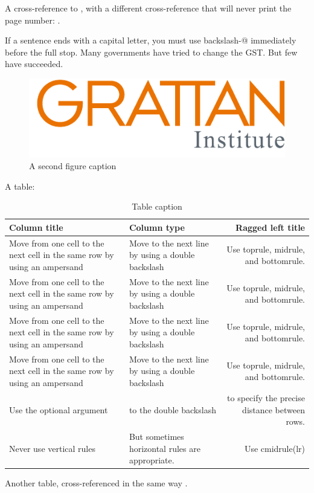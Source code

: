 \documentclass{grattan}
\begin{document}
A cross-reference to , with a different cross-reference that will never print the page number: .

\label{paragraph:sentence-ending-periods}
If a sentence ends with a capital letter, you must use backslash-@ immediately before the full stop.
Many governments have tried to change the GST\@. 
But few have succeeded.

\begin{figure}
\caption{A second figure caption\label{fig:2nd-example-figure}}
\includegraphics{logos/GrattanSVGLogo.pdf}
\end{figure}

A table:

\begin{table}
\caption{Table caption}\label{tbl:one-table}
\begin{tabularx}{\linewidth}{XXR}
%
\toprule
\textbf{Column title}                           & \textbf{Column type}                              & \textbf{Ragged left title} \\
\midrule
Move from one cell to the next cell in the same row by using an ampersand & Move to the next line by using a double backslash & Use toprule, midrule, and bottomrule. \\
Move from one cell to the next cell in the same row by using an ampersand & Move to the next line by using a double backslash & Use toprule, midrule, and bottomrule. \\
Move from one cell to the next cell in the same row by using an ampersand & Move to the next line by using a double backslash & Use toprule, midrule, and bottomrule. \\
Move from one cell to the next cell in the same row by using an ampersand & Move to the next line by using a double backslash & Use toprule, midrule, and bottomrule. \\[15.5pt]
Use the optional argument & to the double backslash & to specify the precise distance between rows. \\
\cmidrule(lr){2-3}
Never use vertical rules & But sometimes horizontal rules are appropriate. & Use cmidrule(lr) \\
\bottomrule
\end{tabularx}



\end{table}
Another table, cross-referenced in the same way .
\end{document}
